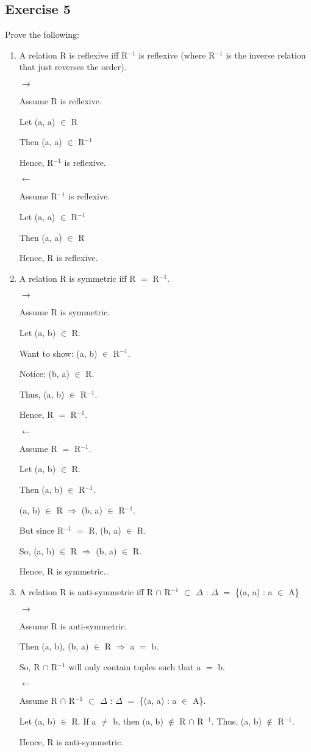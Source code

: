 \documentclass{article}
\newcommand{\mt}[1]{\ensuremath{#1}}
\newcommand\ssc[2][\DefaultOpt]{%
  \def\DefaultOpt{#2}%
  \subsection[#1]{#2}%
}
\newcommand{\balist}{\begin{enumerate}[label=\alph*.]}
\newcommand{\elist}{\end{enumerate}}
\newcommand{\mem}{\mt{\in} }
\newcommand{\sbs}{\mt{\subset} }         %
\newcommand{\lra}{ \mt{\longrightarrow} } %
\newcommand{\rar}{ \mt{\Rightarrow} }     %
\newcommand{\lla}{ \mt{\longleftarrow} }  %
\newcommand{\bk}[1]{\{#1\}}
\newcommand{\eql}{\mt{=} }
\newcommand{\uf}[2]{#1\mt{^{#2}}}
\newcommand{\inn}{\mt{\cap} }
\begin{document}
\ssc{Exercise 5}{
Prove the following:

\balist
\item A relation R is reflexive iff \uf{R}{-1} is reflexive (where \uf{R}{-1} is the inverse relation that just reverses the order).

\lra 

Assume R is reflexive.

Let (a, a) \mem R

Then (a, a) \mem \uf{R}{-1}

Hence, \uf{R}{-1} is reflexive.

\lla

Assume \uf{R}{-1} is reflexive.

Let (a, a) \mem \uf{R}{-1}

Then (a, a) \mem R

Hence, R is reflexive.


\item A relation R is symmetric iff R \eql \uf{R}{-1}.

\lra

Assume R is symmetric.

Let (a, b) \mem R.

Want to show: (a, b) \mem \uf{R}{-1}.

Notice: (b, a) \mem R.

Thus, (a, b) \mem \uf{R}{-1}.

Hence, R \eql \uf{R}{-1}.

\lla

Assume R \eql \uf{R}{-1}.

Let (a, b) \mem R.

Then (a, b) \mem \uf{R}{-1}.

(a, b) \mem R \rar (b, a) \mem \uf{R}{-1}.

But since \uf{R}{-1} \eql R, (b, a) \mem R.

So, (a, b) \mem R \rar (b, a) \mem R.

Hence, R is symmetric..

\item A relation R is anti-symmetric iff R \inn \uf{R}{-1} \sbs $\Delta$ : $\Delta$ \eql \bk{(a, a) : a \mem A}

\lra 

Assume R is anti-symmetric.

Then (a, b), (b, a) \mem R \rar a \eql b.

So, R \inn \uf{R}{-1} will only contain tuples such that a \eql b.

\lla 

Assume R \inn \uf{R}{-1} \sbs $\Delta$ : $\Delta$ \eql \bk{(a, a) : a \mem A}.

Let (a, b) \mem R. If a $\neq$ b, then (a, b) $\not\in$ R \inn \uf{R}{-1}. Thus, (a, b) $\not\in$ \uf{R}{-1}.

Hence, R is anti-symmetric.


\elist
}
\end{document}

